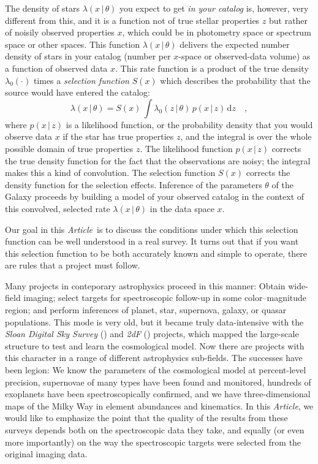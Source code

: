 \documentclass[modern]{aastex62}
\newcommand{\dd}{\mathrm{d}}
\newcommand{\given}{\,|\,}
\newcommand{\documentname}{\textsl{Article}}
\newcommand{\project}[1]{\textsl{#1}}
\begin{document}
The density of stars $\lambda(x\given\theta)$ you expect to get
\emph{in your catalog} is, however, very different from this, and it
is a function not of true stellar properties $z$ but rather of noisily
observed properties $x$, which could be in photometry space or
spectrum space or other spaces.
This function $\lambda(x\given\theta)$ delivers the expected number
density of stars in your catalog (number per $x$-space or observed-data volume)
as a function of observed data $x$.
This rate function is a product of the true density $\lambda_0(\cdot)$
times a \emph{selection function} $S(x)$ which describes the
probability that the source would have entered the catalog:
\begin{equation}
\lambda(x\given\theta) = S(x)\,\int\lambda_0(z\given\theta)\,p(x\given z)\,\dd z
\quad,
\end{equation}
where $p(x\given z)$ is a likelihood function, or the probability
density that you would observe data $x$ if the star has true
properties $z$, and the integral is over the whole possible domain of
true properties $z$.
The likelihood function $p(x\given z)$ corrects the true density function
for the fact that the observations are noisy; the integral makes this a
kind of convolution.
The selection function $S(x)$ corrects the density function for the
selection effects.
Inference of the parameters $\theta$ of the Galaxy proceeds by
building a model of your observed catalog in the context of this
convolved, selected rate $\lambda(x\given\theta)$ in the data space
$x$.

Our goal in this \documentname\ is to discuss the conditions under
which this selection function can be well understood in a real survey.
It turns out that if you want this selection function to be both
accurately known and simple to operate, there are rules that a project
must follow.

Many projects in conteporary astrophysics proceed in this manner:
Obtain wide-field imaging; select targets for spectroscopic follow-up
in some color--magnitude region; and perform inferences of planet,
star, supernova, galaxy, or quasar populations.
This mode is very old, but it became truly data-intensive with
the \project{Sloan Digital Sky Survey} (\citealt{sdss})
and \project{2dF} (\citealt{2df})
projects, which mapped the large-scale structure to test and learn the
cosmological model.
Now there are projects with this character in a range of different
astrophysics sub-fields.
The successes have been legion:
We know the parameters of the cosmological model at percent-level
precision, supernovae of many types have been found and monitored,
hundreds of exoplanets have been spectroscopically confirmed,
and we have three-dimensional maps of the Milky Way in
element abundances and kinematics.
In this \documentname, we would like to emphasize the point that the
quality of the results from these surveys depends both on the
spectroscopic data they take, and equally (or even more importantly)
on the way the spectroscopic targets were selected from the original
imaging data.
\end{document}
